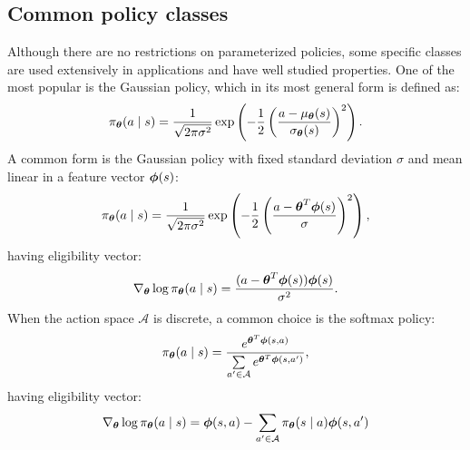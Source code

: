 \subsection{Common policy classes}
Although there are no restrictions on parameterized policies, some specific classes are used extensively in applications and have well studied properties. One of the most popular is the Gaussian policy, which in its most general form is defined as:
\[
	\pi_{\boldsymbol{\theta}}(a \mid s) = \frac{1}{\sqrt{2\pi\sigma^2}}
		\exp\left(-\frac{1}{2}\left(\frac{a-\mu_{\boldsymbol{\theta}}(s)}
		{\sigma_{\boldsymbol{\theta}}(s)}\right)^2\right).
\]
A common form is the Gaussian policy with fixed standard deviation $\sigma$ and mean linear in a feature vector $\boldsymbol{\phi}(s)$:
\[
	\pi_{\boldsymbol{\theta}}(a \mid s) = \frac{1}{\sqrt{2\pi\sigma^2}}\exp\left(
		-\frac{1}{2}\left(\frac{a-\boldsymbol{\theta}^T\boldsymbol{\phi}(s)}{\sigma}\right)^2\right),
\]
having eligibility vector:
\[
	\nabla_{\boldsymbol{\theta}}\log\pi_{\boldsymbol{\theta}}(a \mid s) = \frac{(a - \boldsymbol{\theta}^T\boldsymbol{\phi}(s))\boldsymbol{\phi}(s)}{\sigma^2}.
\]
When the action space $\mathcal{A}$ is discrete, a common choice is the softmax policy:
\[
	\pi_{\boldsymbol{\theta}}(a \mid s) = \frac{e^{\boldsymbol{\theta}^T\boldsymbol{\phi}(s,a)}}
		{\sum\limits_{a' \in \mathcal{A}}e^{\boldsymbol{\theta}^T\boldsymbol{\phi}(s,a')}},
\]
having eligibility vector:
\[
	\nabla_{\boldsymbol{\theta}}\log\pi_{\boldsymbol{\theta}}(a \mid s) = \boldsymbol{\phi}(s,a) - \sum\limits_{a' \in \mathcal{A}}\pi_{\boldsymbol{\theta}}(s \mid a)\boldsymbol{\phi}(s,a')
\]